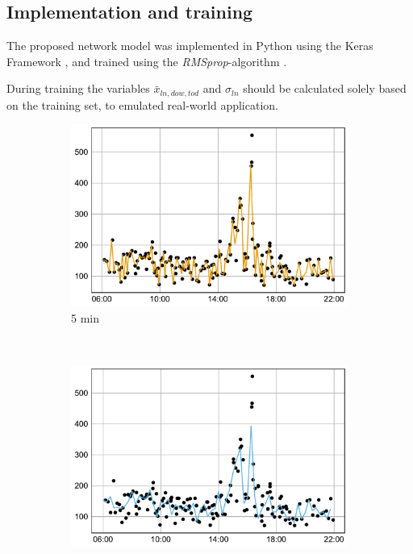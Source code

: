 \documentclass[preprint,11pt,5p,twocolumn]{elsarticle}
\begin{document}
\subsection{Implementation and training}
The proposed network model was implemented in Python using the Keras Framework \cite{Keras}, and trained using the \emph{RMSprop}-algorithm \cite{RMSprop}.

During training the variables $\mathit{\bar{x}_{\mathit{ln},\mathit{dow},\mathit{tod}}}$ and $\sigma_\mathit{ln}$ should be calculated solely based on the training set, to emulated real-world application.

\begin{figure}[!t]
    \centering
    \begin{subfigure}[t]{0.31\textwidth}
        \centering
        \includegraphics[width=\textwidth]{plots/decycle_5min_n.pdf}
        \caption{5 min}
    \end{subfigure}%
    ~ 
    \begin{subfigure}[t]{0.31\textwidth}
        \centering
        \includegraphics[width=\textwidth]{plots/decycle_15min_n.pdf}

\end{subfigure}
\end{figure}
\end{document}
